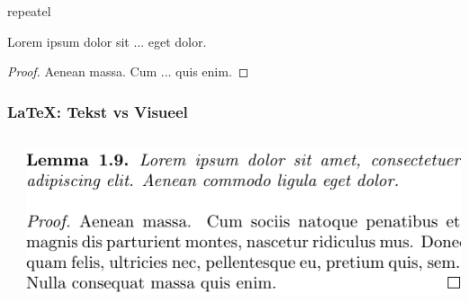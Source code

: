 \documentclass[presentatie.tex]{subfiles}
\begin{document}
\begin{frame}
\begin{columns}
\begin{column}{0.5\textwidth}
                \medskip
            \end{column}
        \end{columns}
    \end{frame}

    \begin{saveblock}{repeatel}
		\begin{highlightblock}[linewidth=0.5\textwidth,gobble=12]
			\begin{lemma}
				Lorem ipsum dolor sit
				... eget dolor.
				
				\begin{proof}
					Aenean massa. Cum
					... quis enim.
				\end{proof}
			\end{lemma}
		\end{highlightblock}
	\end{saveblock}

	\begin{frame}
		\frametitle{\LaTeX: Tekst vs Visueel}
		\begin{columns}
			\begin{column}{0.5\textwidth}
			\end{column}
			\begin{column}{0.5\textwidth}
				\includegraphics[width=\linewidth,height=0.8\textheight,keepaspectratio]{assets/latexRepeatEl.pdf}
			\end{column}
		\end{columns}
	\end{frame}
\end{document}
